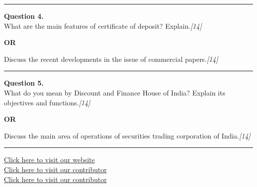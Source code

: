 \documentclass[11pt,a4paper]{article}
\newcommand{\pts}[1]{\hfill   \textit{[#1]}}
\begin{document}
\medskip\rule{\linewidth}{0.2pt}




\noindent   \textbf{Question 4.} \\
What are the main features of certificate of deposit? Explain.\pts{14}

\centerline{   \textbf{OR}}

Discuss the recent developments in the issue of commercial papers.\pts{14}

\medskip\rule{\linewidth}{0.2pt}




\noindent   \textbf{Question 5.} \\
What do you mean by Discount and Finance House of India? Explain its objectives and functions.\pts{14}

\centerline{   \textbf{OR}}

Discuss the main area of operations of securities trading corporation of India.\pts{14}

\vfill
\rule{\linewidth}{0.4pt}

\begin{center}\small
\href{https://bhu-exam.vercel.app/}{Click here to visit our website}\\[4pt]
\href{https://me-aryan.vercel.app/}{Click here to visit our contributor}\\[4pt]
\href{https://quashan-me.vercel.app/}{Click here to visit our contributor}
\end{center}
\end{document}
